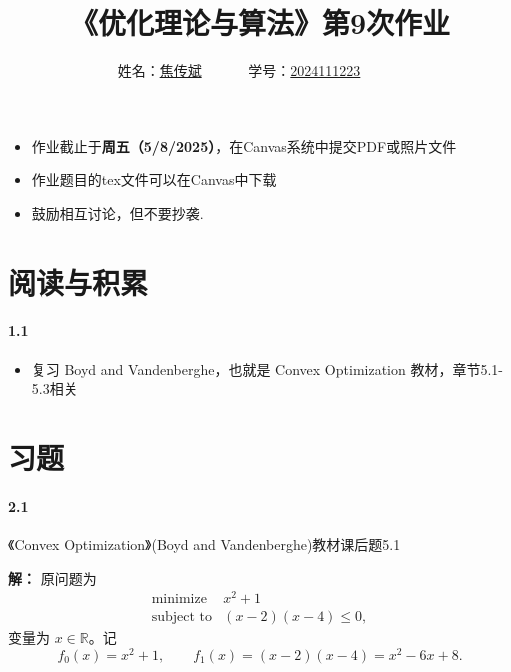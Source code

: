 \documentclass[12pt,a4paper]{article}
\begin{document}
\title{
{《优化理论与算法》第9次作业
}
}
\date{}

 \author{
 姓名：\underline{焦传斌}~~~~~~
 学号：\underline{2024111223}~~~~~~}

\maketitle
\begin{itemize}
	\item 作业截止于{\bf 周五（5/8/2025）}，在Canvas系统中提交PDF或照片文件
	\item 作业题目的tex文件可以在Canvas中下载
	\item 鼓励相互讨论，但不要抄袭.
\end{itemize}

\section{阅读与积累}
\paragraph{1.1}
\begin{itemize}
	\item 复习 Boyd and Vandenberghe，也就是 Convex Optimization 教材，章节5.1-5.3相关
\end{itemize}

\section{习题}


\paragraph{2.1} 《Convex Optimization》(Boyd and Vandenberghe)教材课后题5.1

\textbf{解：}
原问题为
\[
  \begin{array}{ll}
    \text{minimize} & x^2+1\\
    \text{subject to} & (x-2)(x-4)\leq 0,
  \end{array}
\]
变量为 $x\in\mathbb R$。记
\[
  f_0(x)=x^2+1,\qquad
  f_1(x)=(x-2)(x-4)=x^2-6x+8.
\]
\end{document}
